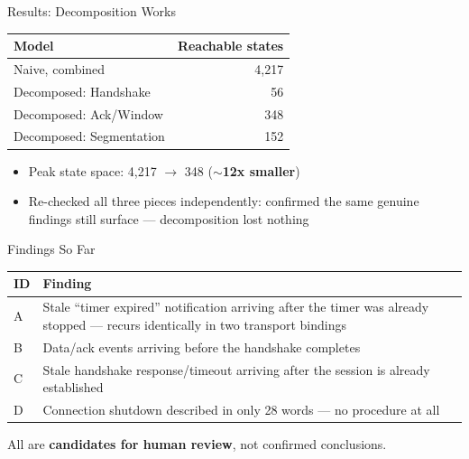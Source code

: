\documentclass{beamer}
\begin{document}
\begin{frame}{Results: Decomposition Works}
\begin{center}
\begin{tabular}{lr}
\toprule
\textbf{Model} & \textbf{Reachable states} \\
\midrule
Naive, combined & 4{,}217 \\
\midrule
Decomposed: Handshake & 56 \\
Decomposed: Ack/Window & 348 \\
Decomposed: Segmentation & 152 \\
\bottomrule
\end{tabular}
\end{center}
\vspace{0.3cm}
\begin{itemize}
  \item Peak state space: 4{,}217 $\rightarrow$ 348 (\textbf{$\sim$12x smaller})
  \item Re-checked all three pieces independently: confirmed the same
        genuine findings still surface — decomposition lost nothing
\end{itemize}
\end{frame}

\begin{frame}{Findings So Far}
\begin{center}
\small
\begin{tabular}{p{1.4cm}p{9.2cm}}
\toprule
\textbf{ID} & \textbf{Finding} \\
\midrule
A & Stale ``timer expired'' notification arriving after the timer was
already stopped — recurs identically in two transport bindings \\
\addlinespace
B & Data/ack events arriving before the handshake completes \\
\addlinespace
C & Stale handshake response/timeout arriving after the session is
already established \\
\addlinespace
D & Connection shutdown described in only 28 words — no procedure at all \\
\bottomrule
\end{tabular}
\end{center}
All are \textbf{candidates for human review}, not confirmed conclusions.
\end{frame}
\end{document}
